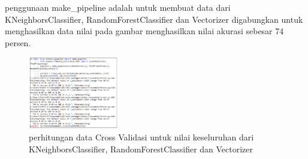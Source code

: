 \begin{enumerate}
        \subitem penggunaan make\_pipeline adalah untuk membuat data dari KNeighborsClassifier, RandomForestClassifier dan Vectorizer digabungkan untuk menghasilkan data nilai pada gambar menghasilkan nilai akurasi sebesar 74 persen. 
        \begin{figure}[H]
            \includegraphics[width=4cm]{figures/1174015/5/34.png}
            \centering
            \caption{perhitungan data Cross Validasi untuk nilai keseluruhan dari KNeighborsClassifier, RandomForestClassifier dan Vectorizer}
        \end{figure}
        
        \end{enumerate}